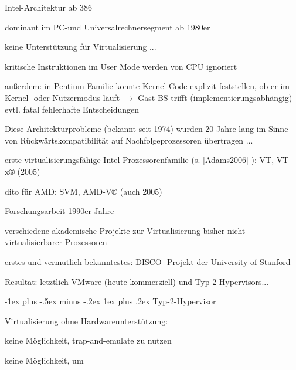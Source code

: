 \documentclass[a4paper]{article}
\makeatletter
\renewcommand{\subsubsection}{\@startsection{subsubsection}{3}{0mm}%
 {-1ex plus -.5ex minus -.2ex}%
 {1ex plus .2ex}%
 {\normalfont\small\bfseries}}
\makeatother
\begin{document}
\begin{multicols}{3}
    Intel-Architektur ab 386

    \begin{itemize*}
        \item dominant im PC-und Universalrechnersegment ab 1980er
        \item keine Unterstützung für Virtualisierung ...
        \item kritische Instruktionen im User Mode werden von CPU ignoriert
        \item außerdem: in Pentium-Familie konnte Kernel-Code explizit feststellen,
        ob er im Kernel- oder Nutzermodus läuft $\rightarrow$
        Gast-BS trifft (implementierungsabhängig) evtl. fatal fehlerhafte
        Entscheidungen
        \item Diese Architekturprobleme (bekannt seit 1974) wurden 20 Jahre lang im
        Sinne von Rückwärtskompatibilität auf Nachfolgeprozessoren übertragen
        ...
        \begin{itemize*}
            \item erste virtualisierungsfähige Intel-Prozessorenfamilie (s. [Adams2006] ): VT, VT-x® (2005)
            \item dito für AMD: SVM, AMD-V® (auch 2005)
        \end{itemize*}
    \end{itemize*}

    Forschungsarbeit 1990er Jahre

    \begin{itemize*}
        \item verschiedene akademische Projekte zur Virtualisierung bisher nicht
        virtualisierbarer Prozessoren
        \item erstes und vermutlich bekanntestes: DISCO- Projekt der University of
        Stanford
        \item Resultat: letztlich VMware (heute kommerziell) und
        Typ-2-Hypervisors...
    \end{itemize*}


    \subsubsection{Typ-2-Hypervisor}


    Virtualisierung ohne Hardwareunterstützung:

    \begin{itemize*}
        \item keine Möglichkeit, trap-and-emulate zu nutzen
        \item keine Möglichkeit, um
        \begin{enumerate*}


\end{enumerate*}
\end{itemize*}
\end{multicols}
\end{document}

